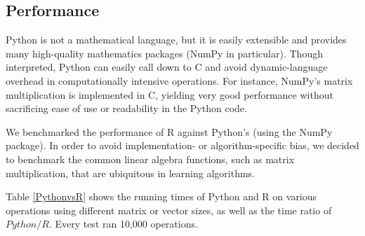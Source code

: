 \documentclass[%
  final,
  notitlepage,
  narroweqnarray,
  inline,
]{ieee}
\begin{document}
\subsection{Performance}

Python is not a mathematical language, but it is easily extensible and provides
many high-quality mathematics packages (NumPy in particular). Though
interpreted, Python can easily call down to C and avoid dynamic-language
overhead in computationally intensive operations. For instance, NumPy's matrix
multiplication is implemented in C, yielding very good performance
without sacrificing ease of use or readability in the Python code.

We benchmarked the performance of R against Python's (using the NumPy package).
In order to avoid implementation- or algorithm-specific bias, we decided to
benchmark the common linear algebra functions, such as matrix multiplication,
that are ubiquitous in learning algorithms.

Table \ref{PythonvsR} shows the running times of Python and R on various
operations using different matrix or vector sizes, as well as the time ratio of
$Python / R$. Every test ran 10,000 operations.
\end{document}
